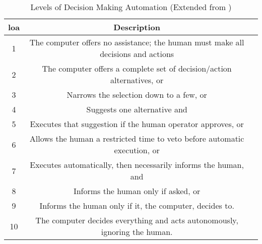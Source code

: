 \begin{table}\centering
  \caption[Levels of Decision Making Automation]{Levels of Decision Making Automation (Extended from \citet{Sheridan1978})}
  \label{tab:autonomy_levels_sheridan}
  \begin{tabularx}{\textwidth}{c c X}\toprule
    \gls{loa} & Description \\ \midrule
    1&    The computer offers no assistance; the human must make all decisions and actions\\
    2&    The computer offers a complete set of decision/action alternatives, or\\
    3&    Narrows the selection down to a few, or\\
    4&    Suggests one alternative and\\
    5&    Executes that suggestion if the human operator approves, or\\
    6&    Allows the human a restricted time to veto before automatic execution, or\\
    7&    Executes automatically, then necessarily informs the human, and\\
    8&    Informs the human only if asked, or\\
    9&    Informs the human only if it, the computer, decides to.\\
    10&   The computer decides everything and acts autonomously, ignoring the human.\\\bottomrule
  \end{tabularx}
\end{table}

